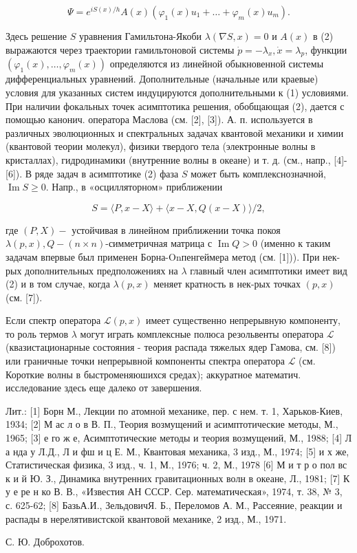 \documentclass[10pt]{article}
\begin{document}
\[

\Psi=e^{i S(x) / h} A(x)\left(\varphi_{1}(x) u_{1}+\ldots+\varphi_{m}(x) u_{m}\right) .

\]



Здесь решение $S$ уравнения Гамильтона-Якоби $\lambda(\nabla S, x)=0$ и $A(x)$ в (2) выражаются через траектории гамильтоновой системы $\dot{p}=-\lambda_{x}, \dot{x}=\lambda_{p}$, функции $\left(\varphi_{1}(x), \ldots, \varphi_{m}(x)\right)$ определяются из линейной обыкновенной системы дифференциальных уравнений. Дополнительные (начальные или краевые) условия для указанных систем индуцируются дополнительными к (1) условиями. При наличии фокальных точек асимптотика решения, обобщающая (2), дается с помощью канонич. оператора Маслова (см. [2], [3]). А. п. используется в различных эволюционных и спектральных задачах квантовой механики и химии (квантовой теории молекул), физики твердого тела (электронные волны в кристаллах), гидродинамики (внутренние волны в океане) и т. д. (см., напр., [4]-[6]). В ряде задач в асимптотике (2) фаза $S$ может быть комплекснозначной, $\operatorname{Im} S \geqslant 0$. Напр., в «осцилляторном» приближении



\[

S=\langle P, x-X\rangle+\langle x-X, Q(x-X)\rangle / 2,

\]



где $(P, X)-$ устойчивая в линейном приближении точка покоя $\lambda(p, x), Q-(n \times n)$-симметричная матрица с $\operatorname{Im} Q>0$ (именно к таким задачам впервые был применен Борна-Onпенгеймера метод (см. [1])). При нек-рых дополнительных предположениях на $\lambda$ главный член асимптотики имеет вид (2) и в том случае, когда $\lambda(p, x)$ меняет кратность в нек-рых точках $(p, x)$ (см. [7]).



Если спектр оператора $\mathscr{L}(p, x)$ имеет существенно непрерывную компоненту, то роль термов $\lambda$ могут играть комплексные полюса резольвенты оператора $\mathscr{L}$ (квазистационарные состояния - теория распада тяжелых ядер Гамова, см. [8]) или граничные точки непрерывной компоненты спектра оператора $\mathscr{L}$ (см. Короткие волны в быстроменяюшихся средах); аккуратное математич. исследование здесь еще далеко от завершения.



Лит.: [1] Борн М., Лекции по атомной механике, пер. с нем. т. 1, Харьков-Киев, 1934; [2] М ас л о в В. П., Теория возмущений и асимптотические методы, М., 1965; [3] е го ж е, Асимптотические методы и теория возмущений, М., 1988; [4] Л а нда у Л.Д., Л и фш и ц Е. М., Квантовая механика, 3 изд., М., 1974; [5] и х же, Статистическая физика, 3 изд., ч. 1, М., 1976; ч. 2, М., 1978 [6] М и т р о пол вс к и й Ю. З., Динамика внутренних гравитационных волн в океане, Л., 1981; [7] К у е ре н ко В. В., «Известия АН СССР. Сер. математическая», 1974, т. 38, № 3, с. 625-62; [8] БазьА.И., ЗельдовичЯ. Б., Переломов А. М., Рассеяние, реакции и распады в нерелятивистской квантовой механике, 2 изд., М., 1971.



С. Ю. Доброхотов.
\end{document}
